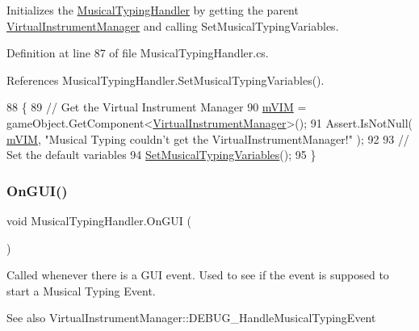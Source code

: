 Initializes the \hyperlink{class_musical_typing_handler}{Musical\+Typing\+Handler} by getting the parent \hyperlink{class_virtual_instrument_manager}{Virtual\+Instrument\+Manager} and calling Set\+Musical\+Typing\+Variables. 



Definition at line 87 of file Musical\+Typing\+Handler.\+cs.



References Musical\+Typing\+Handler.\+Set\+Musical\+Typing\+Variables().


\begin{DoxyCode}
88     \{
89         \textcolor{comment}{// Get the Virtual Instrument Manager}
90         \hyperlink{group___mus_typ_priv_var_ga63b2c5e1f9b1320a6b435a9018759444}{mVIM} = gameObject.GetComponent<\hyperlink{class_virtual_instrument_manager}{VirtualInstrumentManager}>();
91         Assert.IsNotNull( \hyperlink{group___mus_typ_priv_var_ga63b2c5e1f9b1320a6b435a9018759444}{mVIM}, \textcolor{stringliteral}{"Musical Typing couldn't get the VirtualInstrumentManager!"} );
92 
93         \textcolor{comment}{// Set the default variables}
94         \hyperlink{group___mus_typ_priv_func_ga5db8ab750574dbc31279827ea5cc501e}{SetMusicalTypingVariables}();
95     \}
\end{DoxyCode}
\mbox{\label{group___mus_typ_unity_ga13a20522cf119917cb41e21051122977}} 
\subsubsection{\texorpdfstring{On\+G\+U\+I()}{OnGUI()}}
{\footnotesize\ttfamily void Musical\+Typing\+Handler.\+On\+G\+UI (\begin{DoxyParamCaption}{ }\end{DoxyParamCaption})\hspace{0.3cm}{\ttfamily [private]}}



Called whenever there is a G\+UI event. Used to see if the event is supposed to start a Musical Typing Event. 

\begin{DoxySeeAlso}{See also}
Virtual\+Instrument\+Manager\+::\+D\+E\+B\+U\+G\+\_\+\+Handle\+Musical\+Typing\+Event 
\end{DoxySeeAlso}



